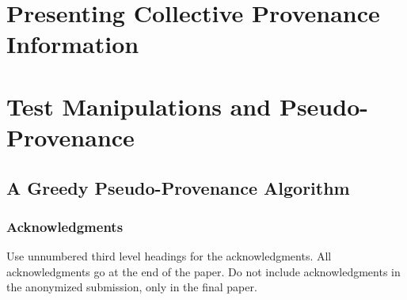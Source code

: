 \documentclass[final]{article}
\begin{document}
\section{Presenting Collective Provenance Information}

\section{Test Manipulations and Pseudo-Provenance}

\subsection{A Greedy Pseudo-Provenance Algorithm}

\subsubsection*{Acknowledgments}

Use unnumbered third level headings for the acknowledgments. All
acknowledgments go at the end of the paper. Do not include
acknowledgments in the anonymized submission, only in the final paper.




\end{document}
